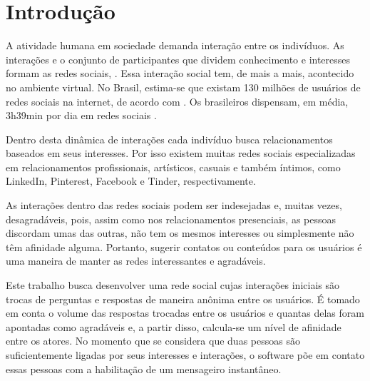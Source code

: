 \chapter{Introdução}




A atividade humana em sociedade demanda interação entre os indivíduos. As interações e o conjunto de participantes que dividem conhecimento e interesses formam as redes sociais, \citep{Marteleto01}. Essa interação social tem, de mais a mais, acontecido no ambiente virtual. No Brasil, estima-se que existam 130 milhões de usuários de redes sociais na internet, de acordo com \cite{wearesocial18}. Os brasileiros dispensam, em média, 3h39min por dia em redes sociais \citep{wearesocial18}.

Dentro desta dinâmica de interações cada indivíduo busca relacionamentos baseados em seus interesses. Por isso existem muitas redes sociais especializadas em relacionamentos profissionais, artísticos, casuais e também íntimos, como LinkedIn, Pinterest, Facebook e Tinder, respectivamente.

As interações dentro das redes sociais podem ser indesejadas e, muitas vezes, desagradáveis, pois, assim como nos relacionamentos presenciais, as pessoas discordam umas das outras, não tem os mesmos interesses ou simplesmente não têm afinidade alguma. Portanto, sugerir contatos ou conteúdos para os usuários é uma maneira de manter as redes interessantes e agradáveis.

Este trabalho busca desenvolver uma rede social cujas interações iniciais são trocas de perguntas e respostas de maneira anônima entre os usuários. É tomado em conta o volume das respostas trocadas entre os usuários e quantas delas foram apontadas como agradáveis e, a partir disso, calcula-se um nível de afinidade entre os atores. No momento que se considera que duas pessoas são suficientemente ligadas por seus interesses e interações, o software põe em contato essas pessoas com a habilitação de um mensageiro instantâneo.

